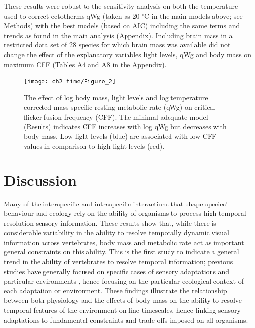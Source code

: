 These results were robust to the sensitivity analysis on both the temperature used to correct ectotherms qWg (taken as 20 $^{\circ}$C in the main models above; see Methods) 
with the best models (based on AIC) including the same terms and trends as found in the main analysis (Appendix). Including brain mass in a restricted data set of 28 species for which brain mass was available did not change the effect of the explanatory variables light levels, qWg and body mass on maximum CFF (Tables A4 and A8 in the Appendix).


\begin{figure}[h!]
  \centering
  \texttt{[image: ch2-time/Figure\_2]}%
  \caption[Figure 3.]{ The effect of  log body mass, light levels and log temperature corrected mass-specific resting metabolic rate (qWg) on critical flicker fusion frequency (CFF). The minimal adequate model (Results) indicates CFF increases with log qWg but decreases with body mass. Low light levels (blue) are associated with low CFF values in comparison to high light levels (red).}
  \label{fig:Figure 3.}
\end{figure}


\section{Discussion}
Many of the interspecific and intraspecific interactions that shape species' behaviour and ecology rely on the ability of organisms to process high temporal resolution sensory information. These results show that, while there is considerable variability in the ability to resolve temporally dynamic visual information across vertebrates, body mass and metabolic rate act as important general constraints on this ability. This is the first study to indicate a general trend in the ability of vertebrates to resolve temporal information; previous studies have generally focused on specific cases of sensory adaptations \citep{fritsches2005warm} and particular environments \citep{frank1999comparative,frank2012light}, hence focusing on the particular ecological context of each adaptation or environment. These findings illustrate the relationship between both physiology and the effects of body mass on the ability to resolve temporal features of the environment on fine timescales, hence linking sensory adaptations to fundamental constraints and trade-offs imposed on all organisms.


